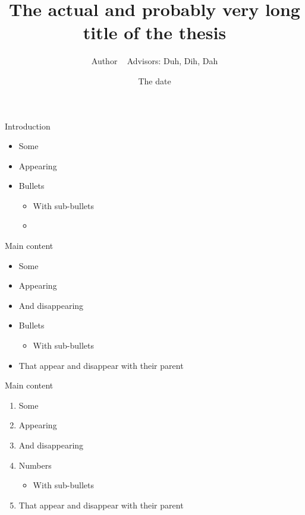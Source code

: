 \documentclass{thesisbeamer}
\title[Short title in footline]{The actual and probably very long title of the thesis}
\author[Name in footline]{Author \newline ~ \newline \normalsize{Advisors: Duh, Dih, Dah}}
\date{The date}
\begin{document}
\MakeTitleNoFoot

\begin{frame}{Introduction}
\begin{itemize}[<+->]
\item Some
\item Appearing
\item Bullets
\begin{itemize}
 \item With sub-bullets
 \item {}
\end{itemize}
\end{itemize}
\end{frame}


\begin{frame}{Main content}
\begin{itemize}[<+>]
\item Some
\item Appearing
  \item And disappearing
\item Bullets
\begin{itemize}[<.>]
 \item With sub-bullets
\end{itemize}
\item That appear and disappear with their parent
\end{itemize}
\end{frame}



\begin{frame}{Main content}
\begin{enumerate}[<+>]
\item Some
\item Appearing
  \item And disappearing
\item Numbers
\begin{itemize}[<.>]
 \item With sub-bullets
\end{itemize}
\item That appear and disappear with their parent
\end{enumerate}
\end{frame}
\end{document}

